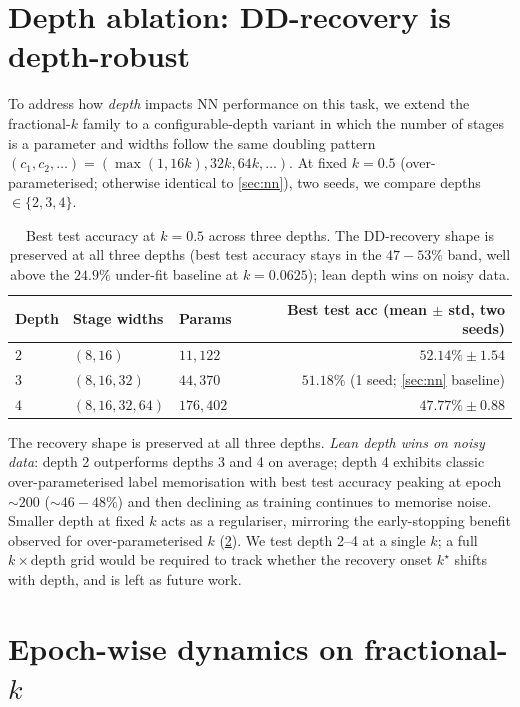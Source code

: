 \documentclass{article}
\begin{document}
\section{Depth ablation: DD-recovery is depth-robust}
\label{app:ablations}

To address how \emph{depth} impacts NN performance on this task, we extend the fractional-$k$ family to a configurable-depth variant in which the number of stages is a parameter and widths follow the same doubling pattern $(c_1,c_2,\ldots) = (\max(1, 16k), 32k, 64k,\ldots)$. At fixed $k\!=\!0.5$ (over-parameterised; otherwise identical to \cref{sec:nn}), two seeds, we compare depths $\in\{2, 3, 4\}$.

\begin{table}[h]
  \centering
  \small
  \caption{Best test accuracy at $k\!=\!0.5$ across three depths. The DD-recovery shape is preserved at all three depths (best test accuracy stays in the $47\!-\!53\%$ band, well above the $24.9\%$ under-fit baseline at $k\!=\!0.0625$); lean depth wins on noisy data.}
  \label{tab:depth-ablation}
  \begin{tabular}{lllr}
    \toprule
    Depth & Stage widths & Params & Best test acc (mean $\pm$ std, two seeds) \\
    \midrule
    $2$ & $(8, 16)$ & $11{,}122$ & $\mathbf{52.14\% \pm 1.54}$ \\
    $3$ & $(8, 16, 32)$ & $44{,}370$ & $51.18\%$ (1 seed; \cref{sec:nn} baseline) \\
    $4$ & $(8, 16, 32, 64)$ & $176{,}402$ & $47.77\% \pm 0.88$ \\
    \bottomrule
  \end{tabular}
\end{table}

The recovery shape is preserved at all three depths. \emph{Lean depth wins on noisy data}: depth 2 outperforms depths 3 and 4 on average; depth 4 exhibits classic over-parameterised label memorisation with best test accuracy peaking at epoch $\sim 200$ ($\sim 46\!-\!48\%$) and then declining as training continues to memorise noise. Smaller depth at fixed $k$ acts as a regulariser, mirroring the early-stopping benefit observed for over-parameterised $k$ (\cref{app:epochwise}). We test depth 2--4 at a single $k$; a full $k\!\times\!\text{depth}$ grid would be required to track whether the recovery onset $k^\star$ shifts with depth, and is left as future work.

\section{Epoch-wise dynamics on fractional-$k$}
\label{app:epochwise}
\end{document}
